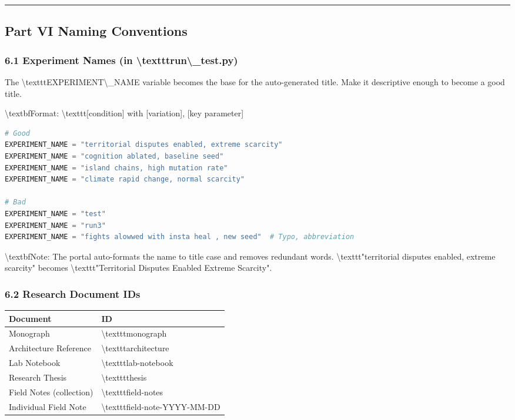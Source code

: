 \documentclass[11pt,a4paper]{article}
\begin{document}
\noindent\rule{\textwidth}{0.4pt}

\subsection*{Part VI  Naming Conventions}

\subsubsection*{6.1 Experiment Names (in \textbackslash{}texttt{run\textbackslash{}\_test.py})}

The \textbackslash{}texttt{EXPERIMENT\textbackslash{}\_NAME} variable becomes the base for the auto-generated title. Make it descriptive enough to become a good title.

\textbackslash{}textbf{Format:} \textbackslash{}texttt{[condition] with [variation], [key parameter]}

\begin{lstlisting}[language=python]
# Good
EXPERIMENT_NAME = "territorial disputes enabled, extreme scarcity"
EXPERIMENT_NAME = "cognition ablated, baseline seed"
EXPERIMENT_NAME = "island chains, high mutation rate"
EXPERIMENT_NAME = "climate rapid change, normal scarcity"

# Bad
EXPERIMENT_NAME = "test"
EXPERIMENT_NAME = "run3"
EXPERIMENT_NAME = "fights alowwed with insta heal , new seed"  # Typo, abbreviation
\end{lstlisting}

\textbackslash{}textbf{Note:} The portal auto-formats the name to title case and removes redundant words. \textbackslash{}texttt{"territorial disputes enabled, extreme scarcity"} becomes \textbackslash{}texttt{"Territorial Disputes Enabled  Extreme Scarcity"}.

\subsubsection*{6.2 Research Document IDs}

\begin{longtable}{ll}
\toprule
Document & ID \\
\midrule
\endhead
Monograph & \textbackslash{}texttt{monograph} \\
Architecture Reference & \textbackslash{}texttt{architecture} \\
Lab Notebook & \textbackslash{}texttt{lab-notebook} \\
Research Thesis & \textbackslash{}texttt{thesis} \\
Field Notes (collection) & \textbackslash{}texttt{field-notes} \\
Individual Field Note & \textbackslash{}texttt{field-note-YYYY-MM-DD} \\
\bottomrule
\end{longtable}
\end{document}
